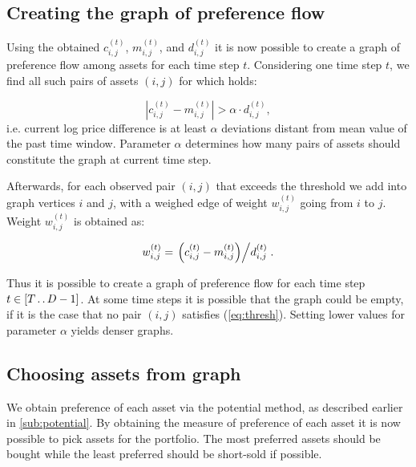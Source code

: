 \documentclass[letterpaper, 10 pt, conference]{ieeeconf}
\newcommand{\upto}{\mathinner {\ldotp \ldotp}}
\begin{document}
  \subsection{Creating the graph of preference flow}
  
  Using the obtained $c_{i,j}^{(t)}$, $m_{i,j}^{(t)}$, and $d_{i,j}^{(t)}$ it is now possible to create a graph of preference flow among assets for each time step $t$.
  Considering one time step $t$, we find all such pairs of assets $(i,j)$ for which holds:
  
  \begin{equation}
    \label{eq:thresh}
    \left| c_{i,j}^{(t)} - m_{i,j}^{(t)} \right| > \alpha \cdot d_{i,j}^{(t)},
  \end{equation}
  i.e. current log price difference is at least $\alpha$ deviations distant from mean value of the past time window.
  Parameter $\alpha$ determines how many pairs of assets should constitute the graph at current time step.

  Afterwards, for each observed pair $(i,j)$ that exceeds the threshold we add into graph vertices $i$ and $j$, with a weighed edge of weight $w_{i,j}^{(t)}$ going from $i$ to $j$. Weight $w_{i,j}^{(t)}$ is obtained as:
  
  \begin{equation}
    \label{eq:weight}
    w_{i,j}^{(t)} = \left. \left(c_{i,j}^{(t)} - m_{i,j}^{(t)}\right) \middle/ d_{i,j}^{(t)} \right..
  \end{equation}
  
  Thus it is possible to create a graph of preference flow for each time step $t \in \left[T \upto D-1\right]$.
  At some time steps it is possible that the graph could be empty, if it is the case that no pair $(i,j)$ satisfies (\ref{eq:thresh}).
  Setting lower values for parameter $\alpha$ yields denser graphs.
  
  \subsection{Choosing assets from graph}
  We obtain preference of each asset via the potential method, as described earlier in \ref{sub:potential}.
  By obtaining the measure of preference of each asset it is now possible to pick assets for the portfolio.
  The most preferred assets should be bought while the least preferred should be short-sold if possible.
  
\end{document}
